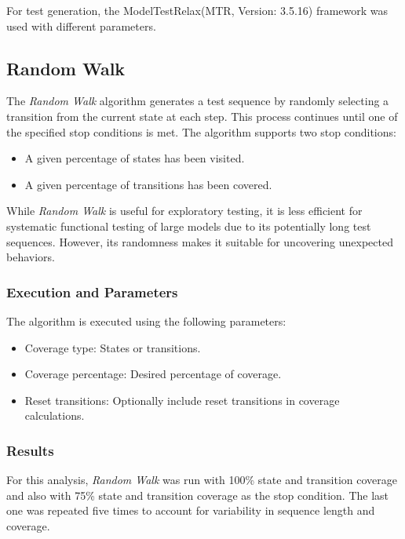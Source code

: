 \documentclass[main.tex]{subfiles}
\begin{document}
For test generation, the ModelTestRelax(MTR,  Version: 3.5.16) framework \cite{mtr} was used with different parameters.

\subsection{Random Walk}
The \textit{Random Walk} algorithm generates a test sequence by randomly selecting a transition from the current state at each step. This process continues until one of the specified stop conditions is met. The algorithm supports two stop conditions:
\begin{itemize}
    \item A given percentage of states has been visited.
    \item A given percentage of transitions has been covered.
\end{itemize}

While \textit{Random Walk} is useful for exploratory testing, it is less efficient for systematic functional testing of large models due to its potentially long test sequences. However, its randomness makes it suitable for uncovering unexpected behaviors.

\subsubsection{Execution and Parameters}
The algorithm is executed using the following parameters:
\begin{itemize}
    \item Coverage type: States or transitions.
    \item Coverage percentage: Desired percentage of coverage.
    \item Reset transitions: Optionally include reset transitions in coverage calculations.
\end{itemize}

\subsubsection{Results}
For this analysis, \textit{Random Walk} was run with 100\% state and transition coverage and also with 75\% state and transition coverage as the stop condition. The last one was repeated five times to account for variability in sequence length and coverage.
\end{document}
